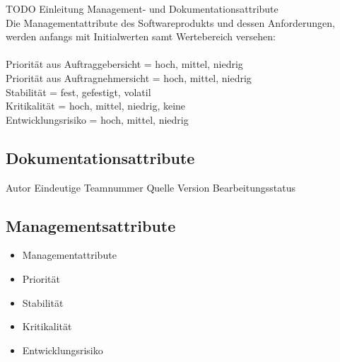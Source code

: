 %                                                                              
%                                                                              

TODO Einleitung Management- und Dokumentationsattribute\\
Die Managementattribute des Softwareprodukts und dessen Anforderungen, werden anfangs mit Initialwerten samt Wertebereich versehen:\\
\ \\
Priorität aus Auftraggebersicht = {hoch, mittel, niedrig}\\
Priorität aus Auftragnehmersicht = {hoch, mittel, niedrig}\\
Stabilität = {fest, gefestigt, volatil}\\
Kritikalität = {hoch, mittel, niedrig, keine}\\
Entwicklungsrisiko = {hoch, mittel, niedrig}\\

\subsection{Dokumentationsattribute}
Autor	
Eindeutige Teamnummer	
Quelle	
Version	
Bearbeitungsstatus	

\subsection{Managementsattribute}
\begin{itemize}
	\item[] Managementattribute
	\item[] Priorität
	\item[]	Stabilität
	\item[] Kritikalität	
	\item[] Entwicklungsrisiko
\end{itemize}


